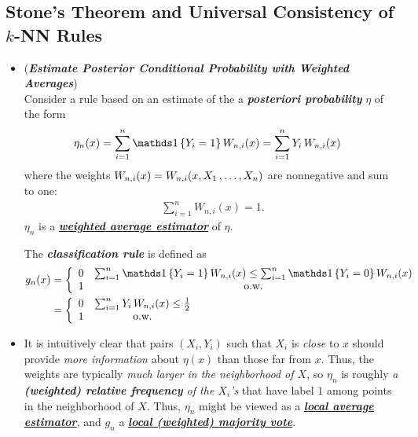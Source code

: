 \documentclass[11pt]{article}
\begin{document}
\subsection{Stone's Theorem and Universal Consistency of $k$-NN Rules}
\begin{itemize}
\item \begin{remark} (\emph{\textbf{Estimate Posterior Conditional Probability with Weighted Averages}})\\
Consider a rule based on an estimate of the a \emph{\textbf{posteriori probability}} $\eta$ of the form
\begin{align*}
\eta_n(x) &= \sum_{i=1}^{n}\ind{Y_i = 1}W_{n,i}(x) = \sum_{i=1}^{n}Y_i \,W_{n,i}(x)
\end{align*}
where the weights $W_{n,i}(x) = W_{n,i}(x, X_1 \,{,}\ldots{,}\, X_n)$ are nonnegative and sum to one:
\begin{align*}
\sum_{i=1}^{n}W_{n,i}(x)  = 1.
\end{align*} $\eta_n$ is a \underline{\emph{\textbf{weighted average estimator}}} of $\eta$. 

The \emph{\textbf{classification rule}} is defined as
\begin{align*}
g_n(x) &= \left\{\begin{array}{cc}
0 &  \sum_{i=1}^{n}\ind{Y_i = 1}W_{n,i}(x)  \le \sum_{i=1}^{n}\ind{Y_i = 0}W_{n,i}(x)  \\
1 & \text{o.w.}
\end{array}
\right. \\
&=  \left\{\begin{array}{cc}
0 &   \sum_{i=1}^{n}Y_i \,W_{n,i}(x) \le \frac{1}{2}  \\
1 & \text{o.w.}
\end{array}
\right.
\end{align*}
\end{remark}

\item \begin{remark}
It is intuitively clear that pairs $(X_i, Y_i)$ such that $X_i$ is \emph{close} to $x$ should provide \emph{more information} about $\eta(x)$ than those far from $x$. Thus, the weights are typically \emph{much larger in the neighborhood of $X$}, so $\eta_n$ is roughly \emph{a \textbf{(weighted) relative frequency} of the $X_i$'s} that have label $1$ among points in the neighborhood of $X$. Thus, $\eta_n$ might be viewed as a \emph{\textbf{\underline{local average estimator}}}, and $g_n$ a \emph{\textbf{\underline{local (weighted) majority vote}}}.
\end{remark}


\end{itemize}
\end{document}
